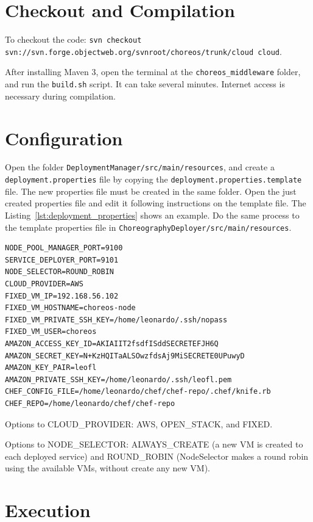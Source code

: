 \documentclass[a4paper, 10pt]{article}
\begin{document}
\section{Checkout and Compilation}

To checkout the code: \texttt{svn checkout svn://svn.forge.objectweb.org/svnroot/choreos/trunk/cloud cloud}. 

After installing Maven 3, open the terminal at the \texttt{choreos\_middleware} folder, and run the \texttt{build.sh} script. It can take several minutes. Internet access is necessary during compilation.

\section{Configuration}

Open the folder \texttt{DeploymentManager/src/main/resources}, and create a \texttt{deployment.properties} file by copying the \texttt{deployment.properties.template} file. The new properties file must be created in the same folder. Open the just created properties file and edit it following instructions on the template file. The Listing~\ref{lst:deployment_properties} shows an example. Do the same process to the template properties file in \texttt{ChoreographyDeployer/src/main/resources}.

\lstset{
numbers=left
}

{\footnotesize
\begin{lstlisting}[caption=deployment.properties example,label=lst:deployment_properties] 
NODE_POOL_MANAGER_PORT=9100
SERVICE_DEPLOYER_PORT=9101
NODE_SELECTOR=ROUND_ROBIN
CLOUD_PROVIDER=AWS
FIXED_VM_IP=192.168.56.102
FIXED_VM_HOSTNAME=choreos-node
FIXED_VM_PRIVATE_SSH_KEY=/home/leonardo/.ssh/nopass
FIXED_VM_USER=choreos
AMAZON_ACCESS_KEY_ID=AKIAIIT2fsdfISddSECRETEFJH6Q
AMAZON_SECRET_KEY=N+KzHQITaALSOwzfdsAj9MiSECRETE0UPuwyD
AMAZON_KEY_PAIR=leofl
AMAZON_PRIVATE_SSH_KEY=/home/leonardo/.ssh/leofl.pem
CHEF_CONFIG_FILE=/home/leonardo/chef/chef-repo/.chef/knife.rb
CHEF_REPO=/home/leonardo/chef/chef-repo
\end{lstlisting}
}

Options to CLOUD\_PROVIDER: AWS, OPEN\_STACK, and FIXED.

Options to NODE\_SELECTOR: ALWAYS\_CREATE (a new VM is created to each deployed service) and ROUND\_ROBIN (\textsf{NodeSelector} makes a round robin using the available VMs, without create any new VM).


\section{Execution}
\end{document}
